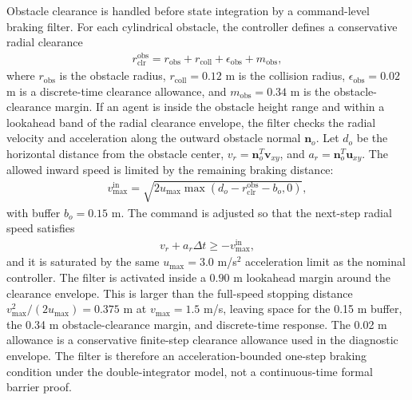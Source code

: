 \documentclass[11pt]{article}
\begin{document}
Obstacle clearance is handled before state integration by a command-level braking filter. For each cylindrical obstacle, the controller defines a conservative radial clearance
\begin{align}
    r^{\mathrm{obs}}_{\mathrm{clr}} =
    r_{\mathrm{obs}} + r_{\mathrm{coll}} + \epsilon_{\mathrm{obs}} + m_{\mathrm{obs}},
\end{align}
where $r_{\mathrm{obs}}$ is the obstacle radius, $r_{\mathrm{coll}}=0.12$ m is the collision radius, $\epsilon_{\mathrm{obs}}=0.02$ m is a discrete-time clearance allowance, and $m_{\mathrm{obs}}=0.34$ m is the obstacle-clearance margin. If an agent is inside the obstacle height range and within a lookahead band of the radial clearance envelope, the filter checks the radial velocity and acceleration along the outward obstacle normal $\mathbf{n}_o$. Let $d_o$ be the horizontal distance from the obstacle center, $v_r=\mathbf{n}_o^T \mathbf{v}_{xy}$, and $a_r=\mathbf{n}_o^T \mathbf{u}_{xy}$. The allowed inward speed is limited by the remaining braking distance:
\begin{align}
    v^{\mathrm{in}}_{\max} =
    \sqrt{2 u_{\max}\max(d_o-r^{\mathrm{obs}}_{\mathrm{clr}}-b_o,0)},
\end{align}
with buffer $b_o=0.15$ m. The command is adjusted so that the next-step radial speed satisfies
\begin{align}
    v_r + a_r \Delta t \geq -v^{\mathrm{in}}_{\max},
\end{align}
and it is saturated by the same $u_{\max}=3.0$ m/s$^2$ acceleration limit as the nominal controller. The filter is activated inside a $0.90$ m lookahead margin around the clearance envelope. This is larger than the full-speed stopping distance $v_{\max}^2/(2u_{\max})=0.375$ m at $v_{\max}=1.5$ m/s, leaving space for the 0.15 m buffer, the 0.34 m obstacle-clearance margin, and discrete-time response. The 0.02 m allowance is a conservative finite-step clearance allowance used in the diagnostic envelope. The filter is therefore an acceleration-bounded one-step braking condition under the double-integrator model, not a continuous-time formal barrier proof.
\end{document}
